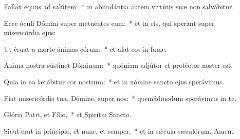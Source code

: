 \item Fallax equus ad salútem:~* in abundántia autem virtútis suæ non salvábitur.

\item Ecce óculi Dómini super metuéntes eum:~* et in eis, qui sperant super misericórdia ejus:

\item Ut éruat a morte ánimas eórum:~* et alat eos in fame.

\item Anima nostra sústinet Dóminum:~* quóniam adjútor et protéctor noster est.

\item Quia in eo lætábitur cor nostrum:~* et in nómine sancto ejus sperávimus.

\item Fiat misericórdia tua, Dómine, super nos:~* quemádmodum sperávimus in te.

\item Glória Patri, et Fílio,~* et Spirítui Sancto.

\item Sicut erat in princípio, et nunc, et semper,~* et in sǽcula sæculórum. Amen.


